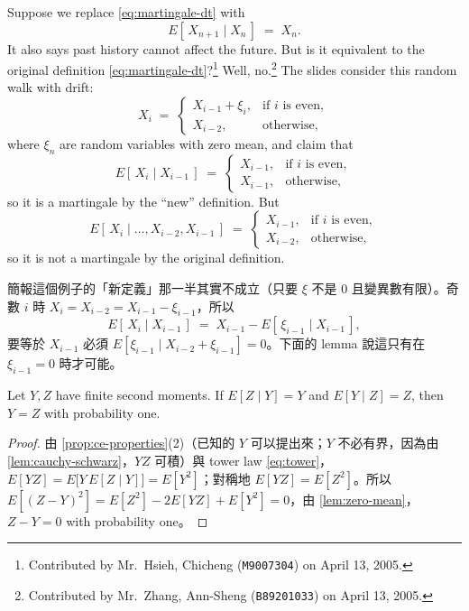 Suppose we replace \eqref{eq:martingale-dt} with
\[
	E[\,X_{n+1}\mid X_{n}\,] \;=\; X_{n} .
\]
It also says past history cannot affect the future.
But is it equivalent to the original definition \eqref{eq:martingale-dt}?\footnote{Contributed by Mr.~Hsieh, Chicheng (\texttt{M9007304}) on April 13, 2005.}
Well, no.\footnote{Contributed by Mr.~Zhang, Ann-Sheng (\texttt{B89201033}) on April 13, 2005.}
The slides consider this random walk with drift:
\[
	X_{i} \;=\;
	\begin{cases}
		X_{i-1}+\xi_{i} , & \text{if $i$ is even}, \\
		X_{i-2} ,         & \text{otherwise},
	\end{cases}
\]
where $\xi_{n}$ are random variables with zero mean, and claim that
\[
	E[\,X_{i}\mid X_{i-1}\,] \;=\;
	\begin{cases}
		X_{i-1} , & \text{if $i$ is even}, \\
		X_{i-1} , & \text{otherwise},
	\end{cases}
\]
so it is a martingale by the ``new'' definition.
But
\[
	E[\,X_{i}\mid\dots,X_{i-2},X_{i-1}\,] \;=\;
	\begin{cases}
		X_{i-1} , & \text{if $i$ is even}, \\
		X_{i-2} , & \text{otherwise},
	\end{cases}
\]
so it is not a martingale by the original definition.

\suppstart
{}

\begin{note}
	簡報這個例子的「新定義」那一半其實不成立（只要 $\xi$ 不是 $0$ 且變異數有限）。奇數 $i$ 時 $X_{i}=X_{i-2}=X_{i-1}-\xi_{i-1}$，所以
	\[
		E[\,X_{i}\mid X_{i-1}\,] \;=\; X_{i-1}-E[\,\xi_{i-1}\mid X_{i-1}\,] ,
	\]
	要等於 $X_{i-1}$ 必須 $E[\xi_{i-1}\mid X_{i-2}+\xi_{i-1}]=0$。下面的 lemma 說這只有在 $\xi_{i-1}=0$ 時才可能。
\end{note}

\begin{lemma}
	\label{lem:two-way-martingale}
	Let $Y,Z$ have finite second moments.
	If $E[Z\mid Y]=Y$ and $E[Y\mid Z]=Z$, then $Y=Z$ with probability one.
\end{lemma}

\begin{proof}
	由 \autoref{prop:ce-properties}(2)（已知的 $Y$ 可以提出來；$Y$ 不必有界，因為由 \autoref{lem:cauchy-schwarz}，$YZ$ 可積）與 tower law \eqref{eq:tower}，$E[YZ]=E\bigl[Y\,E[Z\mid Y]\bigr]=E[Y^{2}]$；對稱地 $E[YZ]=E[Z^{2}]$。所以 $E[(Z-Y)^{2}]=E[Z^{2}]-2E[YZ]+E[Y^{2}]=0$，由 \autoref{lem:zero-mean}，$Z-Y=0$ with probability one。
\end{proof}


